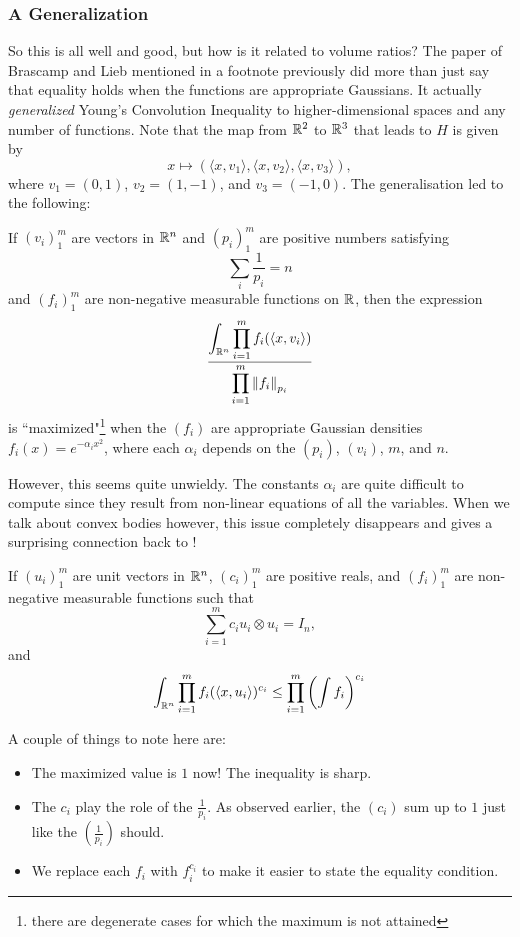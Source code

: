 \subsubsection{A Generalization}

So this is all well and good, but how is it related to volume ratios? The paper of Brascamp and Lieb mentioned in a footnote previously did more than just say that equality holds when the functions are appropriate Gaussians. It actually \textit{generalized} Young's Convolution Inequality to higher-dimensional spaces and any number of functions. Note that the map from $\mathbb{R}^2$ to $\mathbb{R}^3$ that leads to $H$ is given by
\[ x \mapsto (\langle x,v_1\rangle, \langle x,v_2\rangle, \langle x,v_3\rangle), \]
where $v_1 = (0,1)$, $v_2 = (1,-1)$, and $v_3 = (-1,0)$. The generalisation led to the following:
\begin{theorem}
If $(v_i)_1^m$ are vectors in $\mathbb{R}^n$ and $(p_i)_1^m$ are positive numbers satisfying
\[ \sum_i \frac{1}{p_i} = n \]
and $(f_i)_1^m$ are non-negative measurable functions on $\mathbb{R}$, then the expression
\[ \dfrac{\displaystyle\int_{\mathbb{R}^n} \displaystyle\prod_{i=1}^m f_i(\langle x,v_i\rangle) }{\displaystyle\prod_{i=1}^m \left\lVert f_i\right\rVert_{p_i}} \]
is ``maximized"\footnote{there are degenerate cases for which the maximum is not attained} when the $(f_i)$ are appropriate Gaussian densities $f_i(x) = e^{-\alpha_i x^2}$, where each $\alpha_i$ depends on the $(p_i)$, $(v_i)$, $m$, and $n$.
\end{theorem}

However, this seems quite unwieldy. The constants $\alpha_i$ are quite difficult to compute since they result from non-linear equations of all the variables. When we talk about convex bodies however, this issue completely disappears and gives a surprising connection back to !

\begin{ftheo}
\label{ball volume ratio estimate prereq}
If $(u_i)_1^m$ are unit vectors in $\mathbb{R}^n$, $(c_i)_1^m$ are positive reals, and $(f_i)_1^m$ are non-negative measurable functions such that
\[ \sum_{i=1}^m c_i u_i\otimes u_i = I_n, \]
and
\[ \int_{\mathbb{R}^n} \prod_{i=1}^m f_i(\langle x,u_i\rangle)^{c_i} \leq \prod_{i=1}^m \left(\int f_i\right)^{c_i} \]
\end{ftheo}

A couple of things to note here are:
\begin{itemize}
    \item The maximized value is $1$ now! The inequality is sharp.
    \item The $c_i$ play the role of the $\frac{1}{p_i}$. As observed earlier, the $(c_i)$ sum up to $1$ just like the $(\frac{1}{p_i})$ should.
    \item We replace each $f_i$ with $f_i^{c_i}$ to make it easier to state the equality condition.
\end{itemize}

